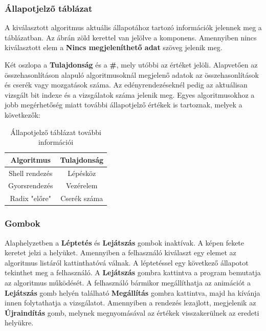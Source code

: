 \documentclass{elteikthesis}
\begin{document}
\subsubsection{Állapotjelző táblázat}
A kiválasztott algoritmus aktuális állapotához tartozó információk jelennek meg a táblázatban. Az ábrán zöld kerettel van jelölve a komponens. Amennyiben nincs kiválasztott elem a \textbf{Nincs megjeleníthető adat} szöveg jelenik meg.\par
Két oszlopa a \textbf{Tulajdonság} és a \textbf{\#}, mely utóbbi az értéket jelöli. Alapvetően az összehasonlításon alapuló algoritmusoknál megjelenő adatok az összehasonlítások és cserék vagy mozgatások száma. Az edényrendezéseknél pedig az aktuálisan vizsgált bit indexe és a vizsgálatok száma jelenik meg. Egyes algoritmusokhoz a jobb megérhetőség miatt további állapotjelző értékek is tartoznak, melyek a következők:
\begin{table}[H]
	\centering
	\begin{tabular}{|c|c|}
		\hline
		\textbf{Algoritmus} & \textbf{Tulajdonság} \\ \hline
		Shell rendezés      & Lépésköz             \\ \hline
		Gyorsrendezés       & Vezérelem            \\ \hline
		Radix "előre"       & Cserék száma         \\ \hline
	\end{tabular}
	\caption{Állapotjelző táblázat további információi}
\end{table}
\subsubsection{Gombok}
Alaphelyzetben a \textbf{Léptetés} és \textbf{Lejátszás} gombok inaktívak. A képen fekete keretet jelzi a helyüket. Amennyiben a felhasználó kiválaszt egy elemet az algoritmus listáról kattinthatóvá válnak. A léptetéssel egy következő állapotot tekinthet meg a felhasználó. A \textbf{Lejátszás} gombra kattintva a program bemutatja az algoritmus működését. A felhasználó bármikor megállíthatja az animációt a \textbf{Lejátszás} gomb helyén található \textbf{Megállítás} gombra kattintva, majd ha kívánja innen folytathatja a vizsgálatot. Amennyiben a rendezés lezajlott, megjelenik az \textbf{Újraindítás} gomb, melynek megnyomásával az értékek visszakerülnek az eredeti helyükre.
\end{document}
